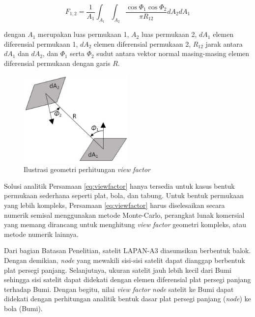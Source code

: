 \begin{equation}
\label{eq:viewfactor}
	F_{1,2} = \frac{1}{A_1} \int_{A_1} \int_{A_2} \frac{\cos{\Phi_1} \cos{\Phi_2}}{\pi R_{12}} dA_2 dA_1
\end{equation}

dengan $A_1$ merupakan luas permukaan 1, $A_2$ luas permukaan 2, $dA_1$ elemen
diferensial permukaan 1, $dA_2$ elemen diferensial permukaan 2, $R_{12}$ jarak
antara $dA_1$ dan $dA_2$, dan $\Phi_1$ serta $\Phi_2$ sudut antara vektor
normal masing-masing elemen diferensial permukaan dengan garis $R$.  

\begin{figure}[!ht]
\setlength{}
\begin{center}
\includegraphics[width=0.5\textwidth]{fig/viewfactor.jpg}
	\caption{Ilustrasi geometri perhitungan \textit{view factor}}
\label{fig:viewfactor}
\end{center}
\end{figure}

Solusi analitik Persamaan \ref{eq:viewfactor} hanya tersedia
untuk kasus bentuk permukaan sederhana seperti plat, bola, dan tabung.
Untuk bentuk permukaan yang lebih kompleks, Persamaan
\ref{eq:viewfactor} harus diselesaikan secara numerik semisal
menggunakan metode Monte-Carlo, perangkat lunak komersial yang memang
dirancang untuk menghitung \textit{view factor} geometri kompleks,
atau metode numerik lainnya.

Dari bagian Batasan Penelitian, satelit LAPAN-A3 diasumsikan berbentuk
balok. Dengan demikian, \textit{node} yang mewakili sisi-sisi
satelit dapat dianggap berbentuk plat persegi panjang. Selanjutnya, ukuran
satelit jauh lebih kecil dari Bumi sehingga sisi satelit dapat didekati dengan
elemen diferensial plat persegi panjang terhadap Bumi. Dengan begitu, nilai
\textit{view factor} \textit{node} satelit ke Bumi dapat didekati
dengan perhitungan analitik bentuk dasar plat persegi panjang
(\textit{node}) ke bola (Bumi). 

